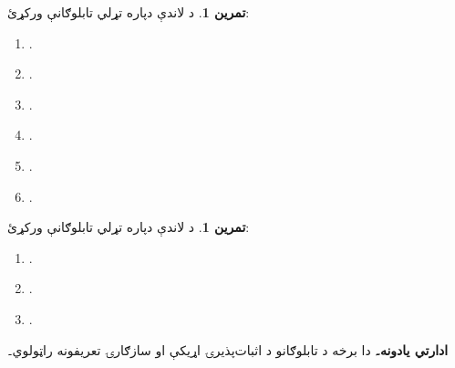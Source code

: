\documentclass[12pt,a4paper,oneside]{report}
\newcommand{\olfileid}[3]{\gdef\pspart{#1}\gdef\pschapter{#2}\gdef\pssection{#3}}
\gdef\pspart{#2}\gdef\pschapter{#3}\gdef\pssection{}%
\theoremstyle{definition}
\newtheorem{prob}[thm]{تمرين}
\newenvironment{editorial}{\begin{framed}\textbf{ادارتي يادونه۔}\enspace}{\end{framed}}
\begin{document}
\label{olpseg:OLP-0104-B011:start}
\begin{prob}
د لاندې دپاره تړلي تابلوګانې ورکړئ:
\begin{enumerate}
\item \LR{$\sFmla{\False}{(\lforall[x][!A(x)] \land \lforall[y][!B(y)])
\lif \lforall[z][(!A(z) \land !B(z))]}$}.
\item \LR{$\sFmla{\False}{(\lexists[x][!A(x)] \lor \lexists[y][!B(y)])
\lif \lexists[z][(!A(z) \lor !B(z))]}$}.
\item {}.
\item \LR{$\sFmla{\True}{\lforall[x][\lnot !A(x)]},
\sFmla{\False}{\lnot\lexists[x][!A(x)]}$}.
\item \LR{$\sFmla{\False}{\lnot\lexists[x][!A(x)] \lif \lforall[x][\lnot
!A(x)]}$}.
\item {}.
\end{enumerate}
\end{prob}
\label{olpseg:OLP-0104-B011:end}

\label{olpseg:OLP-0104-B012:start}
\begin{prob}
د لاندې دپاره تړلي تابلوګانې ورکړئ:
\begin{enumerate}
\item \LR{$\sFmla{\False}{\lnot\lforall[x][!A(x)] \lif \lexists[x][\lnot!A(x)]}$}.
\item {}.
\item {}.
\end{enumerate}
\end{prob}
\label{olpseg:OLP-0104-B012:end}

\label{olpseg:OLP-0105-B004:start}
\olfileid{fol}{tab}{ptn}
\label{olpseg:OLP-0105-B004:end}

\label{olpseg:OLP-0105-B005:start}
\label{olpseg:OLP-0105-B005:end}

\label{olpseg:OLP-0105-B006:start}
\begin{editorial}
دا برخه د تابلوګانو د اثبات‌پذيرۍ اړيکې او سازګارۍ تعريفونه
راټولوي۔
\end{editorial}
\label{olpseg:OLP-0105-B006:end}
\end{document}
